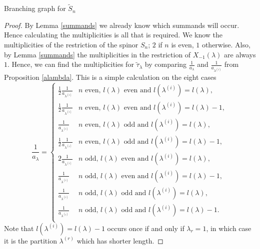 \documentclass[a4paper,10pt]{amsart}
\begin{document}
\begin{section}{Branching graph for $\tilde{S}_n$}
\begin{proof} By Lemma \ref{summands} we already know which summands will occur. Hence calculating the multiplicities is all that is required. We know the multiplicities of the restriction of the spinor $S_n$; $2$ if $n$ is even, $1$ otherwise. Also, by Lemma \ref{summands} the multiplicities in the restriction of $X_{-1}(\lambda)$ are always $1$. Hence, we can find the multiplicities for  $\tilde{\tau}_\lambda$ by comparing $\frac{1}{a_\lambda}$ and $\frac{1}{a_{\lambda^{(i)}}}$ from Proposition \ref{alambda}. This is a simple calculation on the eight cases
$$\frac{1}{a_\lambda} = \begin{cases}
\frac{1}{2} \frac{1}{a_{\lambda^{(i)}}} & n \text{ even, } l(\lambda) \text{ even and } l(\lambda^{(i)}) = l(\lambda),\\
\frac{1}{2}\frac{1}{a_{\lambda^{(i)}}}  & n \text{ even, } l(\lambda) \text{ even and } l(\lambda^{(i)}) = l(\lambda)-1,\\
\frac{1}{a_{\lambda^{(i)}}} & n \text{ even, } l(\lambda) \text{ odd and } l(\lambda^{(i)}) = l(\lambda),\\
\frac{1}{2}\frac{1}{a_{\lambda^{(i)}}} & n \text{ even, } l(\lambda) \text{ odd and } l(\lambda^{(i)}) = l(\lambda)-1,\\
2\frac{1}{a_{\lambda^{(i)}}}& n \text{ odd, } l(\lambda) \text{ even and } l(\lambda^{(i)}) = l(\lambda),\\
\frac{1}{a_{\lambda^{(i)}}} & n \text{ odd, } l(\lambda) \text{ even and } l(\lambda^{(i)}) = l(\lambda)-1,\\
\frac{1}{a_{\lambda^{(i)}}} & n \text{ odd, } l(\lambda) \text{ odd and } l(\lambda^{(i)}) = l(\lambda),\\
\frac{1}{a_{\lambda^{(i)}}} & n \text{ odd, } l(\lambda) \text{ odd and } l(\lambda^{(i)}) = l(\lambda)-1.\\ \end{cases}$$
Note that $l(\lambda^{(i)}) = l(\lambda)-1$ occurs once if and only if $\lambda_r = 1$, in which case it is the partition $\lambda^{(r)}$ which has shorter length.
\end{proof}


\end{section}
\end{document}
